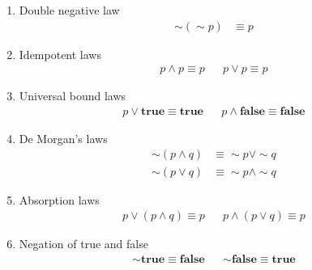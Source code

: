 \documentclass[landscape, a4paper]{article}
\newcommand{\Or}{\vee}
\newcommand{\true}{\textbf{true}}
\newcommand{\false}{\textbf{false}}
\renewcommand{\and}{\wedge}
\begin{document}
\begin{multicols*}{4}
\begin{enumerate}[wide, labelindent=2pt]
        \item Double negative law
              \begin{align*}
                  {\sim}({\sim} p) & \equiv p
              \end{align*}
        \item Idempotent laws
              \begin{align*}
                  p \and p \equiv p &  & p \Or p \equiv p
              \end{align*}
        \item Universal bound laws
              \begin{align*}
                  p \Or \true \equiv \true &  & p \and \false \equiv \false
              \end{align*}
        \item De Morgan’s laws
              \begin{align*}
                  {\sim}(p \and q) & \equiv {\sim} p \Or {\sim} q  \\
                  {\sim}(p \Or q)  & \equiv {\sim} p \and {\sim} q
              \end{align*}
        \item Absorption laws
              \begin{align*}
                  p \Or (p \and q) \equiv p &  &
                  p \and (p \Or q) \equiv p
              \end{align*}
        \item Negation of true and false
              \begin{align*}
                  {\sim} \true \equiv \false &  & {\sim} \false \equiv \true
              \end{align*}

    \end{enumerate}


\end{multicols*}
\end{document}
